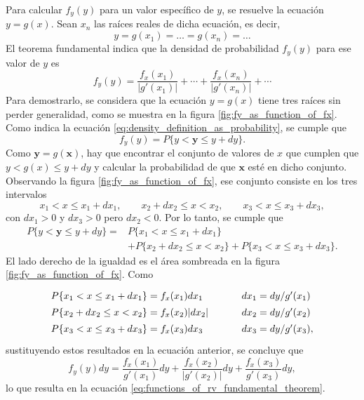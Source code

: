 \documentclass[a4paper]{report}
\newcommand{\x}{\mathbf{x}}
\newcommand{\y}{\mathbf{y}}
\begin{document}
Para calcular \(f_y(y)\) para un valor específico de \(y\), se resuelve la ecuación \(y=g(x)\). Sean \(x_n\) las raíces reales de dicha ecuación, es decir,
\[
 y=g(x_1)=\dots=g(x_n)=\dots
\]
El teorema fundamental indica que la densidad de probabilidad \(f_y(y)\) para ese valor de \(y\) es
\begin{equation}\label{eq:functions_of_rv_fundamental_theorem}
 f_y(y)=\frac{f_x(x_1)}{\left|g'(x_1)\right|}+\cdots+\frac{f_x(x_n)}{\left|g'(x_n)\right|}+\cdots
\end{equation}
Para demostrarlo, se considera que la ecuación \(y=g(x)\) tiene tres raíces sin perder generalidad, como se muestra en la figura \ref{fig:fy_as_function_of_fx}. Como indica la ecuación \ref{eq:density_definition_as_probability}, se cumple que
\[
 f_y(y)=P\{y<\y\leq y+dy\}.
\]
Como \(\y=g(\x)\), hay que encontrar el conjunto de valores de \(x\) que cumplen que \(y<g(x)\leq y+dy\) y calcular la  probabilidad de que \(\x\) esté en dicho conjunto. Observando la figura \ref{fig:fy_as_function_of_fx}, ese conjunto consiste en los tres intervalos
\[
 x_1<x\leq x_1+dx_1,\qquad x_2+dx_2\leq x<x_2,\qquad x_3<x\leq x_3+dx_3, 
\]
con \(dx_1>0\) y \(dx_3>0\) pero \(dx_2<0\). Por lo tanto, se cumple que
\begin{align*}
 P\{y<\y\leq y+dy\}=&P\{x_1<x\leq x_1+dx_1\}\\
    &+P\{x_2+dx_2\leq x<x_2\}+P\{x_3<x\leq x_3+dx_3\}.
\end{align*}
El lado derecho de la igualdad es el área sombreada en la figura \ref{fig:fy_as_function_of_fx}. Como
\[\arraycolsep=1.4pt\def\arraystretch{1.4}
 \begin{array}{lllp{1cm}lll}
   P\{x_1<x\leq x_1+dx_1\}&=&f_x(x_1)dx_1&  &dx_1&=&dy/g'(x_1)\\
   P\{x_2+dx_2\leq x<x_2\}&=&f_x(x_2)|dx_2|&  &dx_2&=&dy/g'(x_2)\\
   P\{x_3<x\leq x_3+dx_3\}&=&f_x(x_3)dx_3&  &dx_3&=&dy/g'(x_3),
 \end{array}
\]
sustituyendo estos resultados en la ecuación anterior, se concluye que
\[
 f_y(y)dy=\frac{f_x(x_1)}{g'(x_1)}dy+\frac{f_x(x_2)}{|g'(x_2)|}dy+\frac{f_x(x_3)}{g'(x_3)}dy,
\]
lo que resulta en la ecuación \ref{eq:functions_of_rv_fundamental_theorem}.
\end{document}
